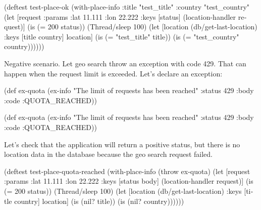 \else

\begin{english}
  \begin{clojure}
(deftest test-place-ok
  (with-place-info
    {:title "test_title"
     :country "test_country"}
    (let [request {:params {:lat 11.111 :lon 22.222}}
          {:keys [status]} (location-handler request)]
      (is (= 200 status))
      (Thread/sleep 100)
      (let [location (db/get-last-location)
            {:keys [title country]} location]
        (is (= "test_title" title))
        (is (= "test_country" country))))))
  \end{clojure}
\end{english}

\fi


Negative scenario. Let geo search throw an exception with code 429.
That can happen when the request limit is exceeded. Let's declare an exception:

\ifx\DEVICETYPE\MOBILE

\begin{english}
  \begin{clojure}
(def ex-quota
  (ex-info
    "The limit of requests
               has been reached"
    {:status 429
     :body {:code :QUOTA_REACHED}}))
  \end{clojure}
\end{english}

\else

\begin{english}
  \begin{clojure}
(def ex-quota
  (ex-info "The limit of requests has been reached"
           {:status 429 :body {:code :QUOTA_REACHED}}))
  \end{clojure}
\end{english}

\fi

\noindent
Let's check that the application will return a positive status, but there is no location data in the database because the geo search request failed.

\ifx\DEVICETYPE\MOBILE

\begin{english}
  \begin{clojure}
(deftest test-place-quota-reached
  (with-place-info (throw ex-quota)
  (let [request {:params {:lat 11.111
                          :lon 22.222}}
        {:keys [status body]}
        (location-handler request)]
      (is (= 200 status))
      (Thread/sleep 100)
      (let [location
            (db/get-last-location)
            {:keys [title country]}
            location]
        (is (nil? title))
        (is (nil? country))))))
  \end{clojure}
\end{english}

